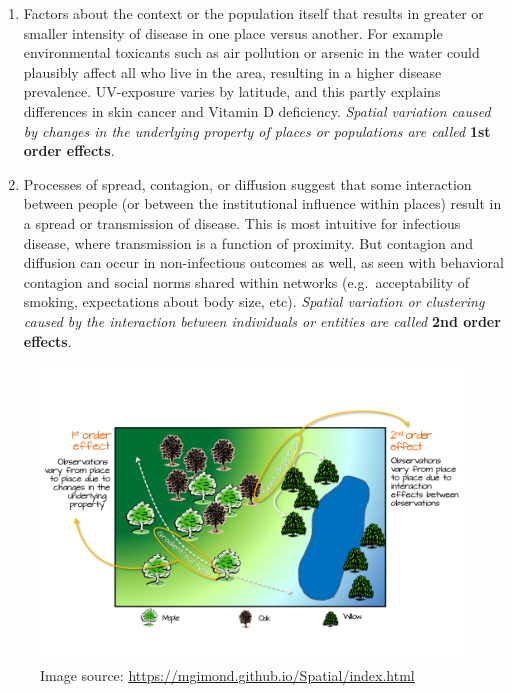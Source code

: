\documentclass[
]{book}
\providecommand{\tightlist}{%
  \setlength{\itemsep}{0pt}\setlength{\parskip}{0pt}}
\begin{document}
\begin{enumerate}
\def\labelenumi{\arabic{enumi}.}
\tightlist
\item
  Factors about the context or the population itself that results in greater or smaller intensity of disease in one place versus another. For example environmental toxicants such as air pollution or arsenic in the water could plausibly affect all who live in the area, resulting in a higher disease prevalence. UV-exposure varies by latitude, and this partly explains differences in skin cancer and Vitamin D deficiency. \emph{Spatial variation caused by changes in the underlying property of places or populations are called} \textbf{1st order effects}.
\item
  Processes of spread, contagion, or diffusion suggest that some interaction between people (or between the institutional influence within places) result in a spread or transmission of disease. This is most intuitive for infectious disease, where transmission is a function of proximity. But contagion and diffusion can occur in non-infectious outcomes as well, as seen with behavioral contagion and social norms shared within networks (e.g.~acceptability of smoking, expectations about body size, etc). \emph{Spatial variation or clustering caused by the interaction between individuals or entities are called} \textbf{2nd order effects}.
\end{enumerate}

\begin{figure}
\centering
\includegraphics{images/1st_2nd_order_property.png}
\caption{\label{fig:unnamed-chunk-232}Image source: \url{https://mgimond.github.io/Spatial/index.html}}
\end{figure}
\end{document}
